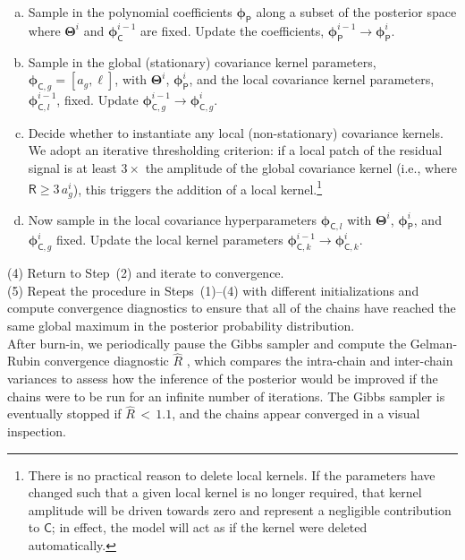 \documentclass[iop,floatfix]{emulateapj}
\newcommand{\vR}{\mathsf{R}}
\newcommand{\vC}{\mathsf{C}}
\newcommand{\vT}{ {\bm \Theta}}
\newcommand{\vp}{ {\bm \phi}}
\newcommand{\cheb}{ \vp_{\mathsf{P}}}
\newcommand{\cov}{ \vp_{\mathsf{C}}}
\begin{document}
\begin{enumerate}[(a)]
\item Sample in the polynomial coefficients $\cheb$ along a subset of the posterior space where 
$\vT^i$ and $\cov^{i-1}$ are fixed.  Update the coefficients, $\cheb^{i-1} \rightarrow \cheb^i$.  

\item Sample in the global (stationary) covariance kernel parameters, $\vp_{{\mathsf C},g} = 
[a_g, \ell]$, with $\vT^i$, $\cheb^i$, and the local covariance kernel parameters, 
$\vp_{{\mathsf C}, l}^{i-1}$, fixed.  Update $\vp_{{\mathsf C}, g}^{i-1} \rightarrow \vp_{{\mathsf 
C}, g}^i$.

\item Decide whether to instantiate any local (non-stationary) covariance kernels.  We adopt an 
iterative thresholding criterion: if a local patch of the residual signal is at least $3\times$ the 
amplitude of the global covariance kernel (i.e., where $\vR \ge 3 \, a_g^i$), this triggers the 
addition of a local kernel.\footnote{There is no practical reason to delete local kernels.  If the 
parameters have changed such that a given local kernel is no longer required, that kernel amplitude 
will be driven towards zero and represent a negligible contribution to $\vC$; in effect, the model 
will act as if the kernel were deleted automatically.}

\item Now sample in the local covariance hyperparameters $\vp_{{\mathsf C},l}$ with $\vT^i$, 
$\cheb^i$, and $\vp_{{\mathsf C}, g}^i$ fixed.  Update the local kernel parameters 
$\vp_{{\mathsf C}, k}^{i-1} \rightarrow \vp_{{\mathsf C}, k}^i$.  
\end{enumerate}

\noindent (4) Return to Step~(2) and iterate to convergence. \\

\noindent (5) Repeat the procedure in Steps~(1)--(4) with different initializations and compute 
convergence diagnostics to ensure that all of the chains have reached the same global maximum in 
the posterior probability distribution. \\

After burn-in, we periodically pause the Gibbs sampler and compute the Gelman-Rubin convergence 
diagnostic  $\hat{R}$ \citep[][their Eq.~11.4]{gelman13}, which compares the intra-chain and 
inter-chain variances to assess how the inference of the posterior would be improved if the chains 
were to be run for an infinite number of iterations.  The Gibbs sampler is eventually stopped if 
$\hat{R} \, < \, 1.1$, and the chains appear converged in a visual inspection. 
\end{document}
